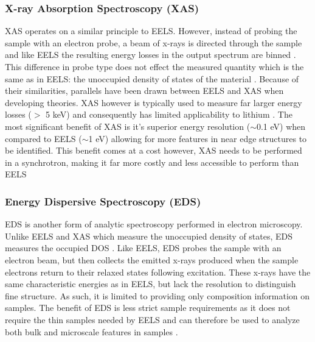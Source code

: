 \subsubsection{X-ray Absorption Spectroscopy (XAS)}
XAS operates on a similar principle to EELS. However, instead of probing the sample with an electron probe, a beam of x-rays is directed through the sample and like EELS the resulting energy losses in the output spectrum are binned \cite{groot_high-resolution_2001}.  This difference in probe type does not effect the measured quantity which is the same as in EELS: the unoccupied density of states of the material \cite{groot_high-resolution_2001}.  Because of their similarities, parallels have been drawn between EELS and XAS when developing theories. XAS however is typically used to measure far larger energy losses ($>$ 5 keV) and consequently has limited applicability to lithium \cite{maclaren_eels_2018}.  The most significant benefit of XAS is it's superior energy resolution ($\sim$0.1 eV) when compared to EELS ($\sim$1 eV) allowing for more features in near edge structures to be identified\cite{Egerton, groot_high-resolution_2001}.  This benefit comes at a cost however, XAS needs to be performed in a synchrotron, making it far more costly and less accessible to perform than EELS


\subsubsection{Energy Dispersive Spectroscopy (EDS)}
EDS is another form of analytic spectroscopy performed in electron microscopy.   Unlike EELS and XAS which measure the unoccupied density of states, EDS measures the occupied DOS \cite{goldstein_electron_2003}.  Like EELS, EDS probes the sample with an electron beam, but then collects the emitted x-rays produced when the sample electrons return to their relaxed states following excitation.  These x-rays have the same characteristic energies as in EELS, but lack the resolution to distinguish fine structure.  As such, it is limited to providing only composition information on samples.  The benefit of EDS is less strict sample requirements as it does not require the thin samples needed by EELS and can therefore be used to analyze both bulk and microscale features in samples \cite{goldstein_electron_2003}.







